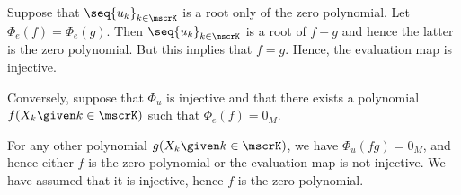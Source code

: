 \begin{defproof}
   Suppose that \( \seq{ u_k }_{k \in \mscrK} \) is a root only of the zero polynomial. Let \( \Phi_e(f) = \Phi_e(g) \). Then \( \seq{ u_k }_{k \in \mscrK} \) is a root of \( f - g \) and hence the latter is the zero polynomial. But this implies that \( f = g \). Hence, the evaluation map is injective.

   Conversely, suppose that \( \Phi_u \) is injective and that there exists a polynomial \( f(X_k \given k \in \mscrK) \) such that \( \Phi_e(f) = 0_M \).

  For any other polynomial \( g(X_k \given k \in \mscrK) \), we have \( \Phi_u(f g) = 0_M \), and hence either \( f \) is the zero polynomial or the evaluation map is not injective. We have assumed that it is injective, hence \( f \) is the zero polynomial.
\end{defproof}

